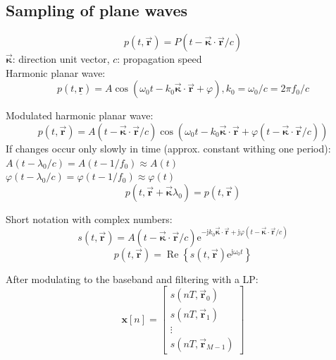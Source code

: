 \documentclass[english]{latex4ei/latex4ei_sheet}
\renewcommand{\vec}[1]{\underline{\boldsymbol{#1}}}
\begin{document}
\begin{sectionbox}
  \subsection{Sampling of plane waves}
  $$p(t, \overrightarrow{\boldsymbol{r}})=P(t-\overrightarrow{\boldsymbol{\kappa}} \cdot \overrightarrow{\boldsymbol{r}} / c)$$
  $\overrightarrow{\boldsymbol{\kappa}}$: direction unit vector, $c$: propagation speed\\
  Harmonic planar wave:
  $$p(t, \vec{r})=A \cos \left(\omega_{0} t-k_{0} \overrightarrow{\boldsymbol{\kappa}} \cdot \overrightarrow{\boldsymbol{r}}+\varphi\right), k_{0}=\omega_{0} / c=2 \pi f_{0} / c$$

  Modulated harmonic planar wave:
  $$p(t, \overrightarrow{\boldsymbol{r}})=A(t-\overrightarrow{\boldsymbol{\kappa}} \cdot \overrightarrow{\boldsymbol{r}} / c) \cos \left(\omega_{0} t-k_{0} \overrightarrow{\boldsymbol{\kappa}} \cdot \overrightarrow{\boldsymbol{r}}+\varphi(t-\overrightarrow{\boldsymbol{\kappa}} \cdot \overrightarrow{\boldsymbol{r}} / c)\right)$$
  If changes occur only slowly in time (approx. constant withing one period):\\
  $A\left(t-\lambda_{0} / c\right)=A\left(t-1 / f_{0}\right) \approx A(t)$ \\
  $\varphi\left(t-\lambda_{0} / c\right)=\varphi\left(t-1 / f_{0}\right) \approx \varphi(t)$
  $$p\left(t, \overrightarrow{\boldsymbol{r}}+\overrightarrow{\boldsymbol{\kappa}} \lambda_{0}\right)=p(t, \overrightarrow{\boldsymbol{r}})$$

  Short notation with complex numbers: 
$$s(t, \overrightarrow{\boldsymbol{r}})=A(t-\overrightarrow{\boldsymbol{\kappa}} \cdot \overrightarrow{\boldsymbol{r}} / c) \mathrm{e}^{-\mathrm{j} k_{0} \overrightarrow{\boldsymbol{\kappa}} \cdot \overrightarrow{\boldsymbol{r}}+\mathrm{j} \varphi(t-\overrightarrow{\boldsymbol{\kappa}} \cdot \overrightarrow{\boldsymbol{r}} / c)}$$
$$p(t, \overrightarrow{\boldsymbol{r}})=\operatorname{Re}\left\{s(t, \overrightarrow{\boldsymbol{r}}) \mathrm{e}^{\mathrm{j} \omega_{0} t}\right\}$$

  After modulating to the baseband and filtering with a LP:
$$\boldsymbol{x}[n]=\left[\begin{array}{c}
  s\left(n T, \overrightarrow{\boldsymbol{r}}_{0}\right) \\
  s\left(n T, \overrightarrow{\boldsymbol{r}}_{1}\right) \\
  \vdots \\
  s\left(n T, \overrightarrow{\boldsymbol{r}}_{M-1}\right)
  \end{array}\right]$$


\end{sectionbox}
\end{document}
